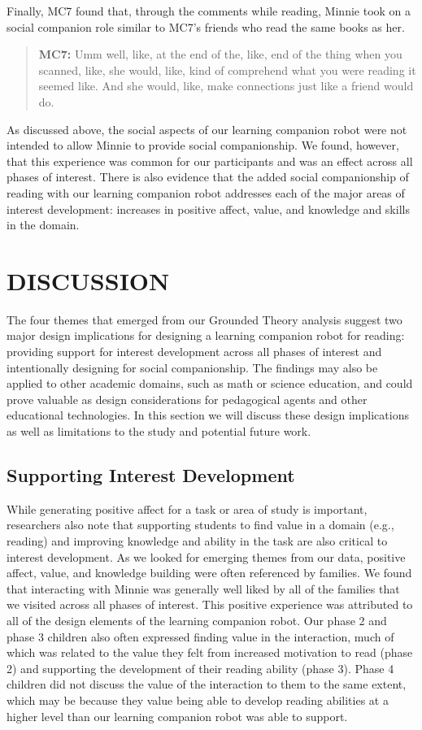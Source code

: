 \documentclass{sigchi}
\begin{document}
 Finally, MC7 found that, through the comments while reading, Minnie took on a social companion role similar to MC7's friends who read the same books as her.
 
	 \begin{quote}
	 	 \textbf{MC7:} Umm well, like, at the end of the, like, end of the thing when you scanned, like, she would, like, kind of comprehend what you were reading it seemed like. And she would, like, make connections just like a friend would do. 
	 \end{quote}
 
As discussed above, the social aspects of our learning companion robot were not intended to allow Minnie to provide social companionship. We found, however, that this experience was common for our participants and was an effect across all phases of interest. There is also evidence that the added social companionship of reading with our learning companion robot addresses each of the major areas of interest development: increases in positive affect, value, and knowledge and skills in the domain.


\section{DISCUSSION}
The four themes that emerged from our Grounded Theory analysis suggest two major design implications for designing a learning companion robot for reading: providing support for interest development across all phases of interest and intentionally designing for social companionship. The findings may also be applied to other academic domains, such as math or science education, and could prove valuable as design considerations for pedagogical agents and other educational technologies. In this section we will discuss these design implications as well as limitations to the study and potential future work.

\subsection{Supporting Interest Development}
While generating positive affect for a task or area of study is important, researchers also note that supporting students to find value in a domain (e.g., reading) and improving knowledge and ability in the task are also critical to interest development. As we looked for emerging themes from our data, positive affect, value, and knowledge building were often referenced by families. We found that interacting with Minnie was generally well liked by all of the families that we visited across all phases of interest. This positive experience was attributed to all of the design elements of the learning companion robot. Our phase 2 and phase 3 children also often expressed finding value in the interaction, much of which was related to the value they felt from increased motivation to read (phase 2) and supporting the development of their reading ability (phase 3). Phase 4 children did not discuss the value of the interaction to them to the same extent, which may be because they value being able to develop reading abilities at a higher level than our learning companion robot was able to support. 
\end{document}
